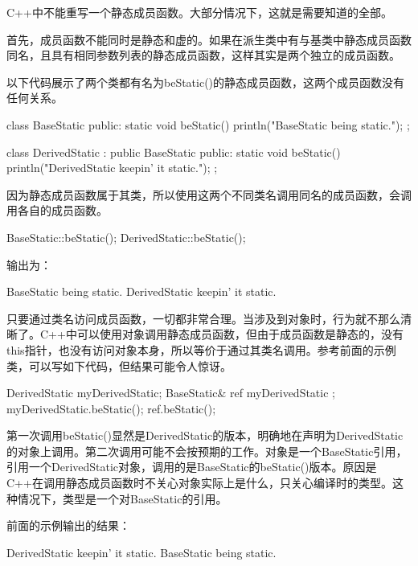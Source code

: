 C++中不能重写一个静态成员函数。大部分情况下，这就是需要知道的全部。

首先，成员函数不能同时是静态和虚的。如果在派生类中有与基类中静态成员函数同名，且具有相同参数列表的静态成员函数，这样其实是两个独立的成员函数。

以下代码展示了两个类都有名为beStatic()的静态成员函数，这两个成员函数没有任何关系。

\begin{cpp}
class BaseStatic
{
    public:
    static void beStatic() { println("BaseStatic being static."); }
};

class DerivedStatic : public BaseStatic
{
    public:
    static void beStatic() { println("DerivedStatic keepin' it static."); }
};
\end{cpp}

因为静态成员函数属于其类，所以使用这两个不同类名调用同名的成员函数，会调用各自的成员函数。

\begin{cpp}
BaseStatic::beStatic();
DerivedStatic::beStatic();
\end{cpp}

输出为：

\begin{shell}
BaseStatic being static.
DerivedStatic keepin' it static.
\end{shell}

只要通过类名访问成员函数，一切都非常合理。当涉及到对象时，行为就不那么清晰了。C++中可以使用对象调用静态成员函数，但由于成员函数是静态的，没有this指针，也没有访问对象本身，所以等价于通过其类名调用。参考前面的示例类，可以写如下代码，但结果可能令人惊讶。

\begin{cpp}
DerivedStatic myDerivedStatic;
BaseStatic& ref { myDerivedStatic };
myDerivedStatic.beStatic();
ref.beStatic();
\end{cpp}

第一次调用beStatic()显然是DerivedStatic的版本，明确地在声明为DerivedStatic的对象上调用。第二次调用可能不会按预期的工作。对象是一个BaseStatic引用，引用一个DerivedStatic对象，调用的是BaseStatic的beStatic()版本。原因是C++在调用静态成员函数时不关心对象实际上是什么，只关心编译时的类型。这种情况下，类型是一个对BaseStatic的引用。

前面的示例输出的结果：

\begin{shell}
DerivedStatic keepin' it static.
BaseStatic being static.
\end{shell}

